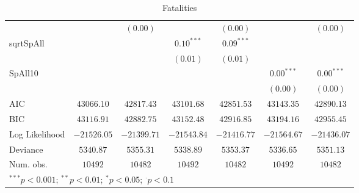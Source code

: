 \begin{sidewaystable}
\begin{center}
{\begin{tabular}{l c c c c c c}
                &               & $(0.00)$      &               & $(0.00)$      &               & $(0.00)$      \\
sqrtSpAll       &               &               & $0.10^{***}$  & $0.09^{***}$  &               &               \\
                &               &               & $(0.01)$      & $(0.01)$      &               &               \\
SpAll10         &               &               &               &               & $0.00^{***}$  & $0.00^{***}$  \\
                &               &               &               &               & $(0.00)$      & $(0.00)$      \\
\hline
AIC             & $43066.10$    & $42817.43$    & $43101.68$    & $42851.53$    & $43143.35$    & $42890.13$    \\
BIC             & $43116.91$    & $42882.75$    & $43152.48$    & $42916.85$    & $43194.16$    & $42955.45$    \\
Log Likelihood  & $-21526.05$   & $-21399.71$   & $-21543.84$   & $-21416.77$   & $-21564.67$   & $-21436.07$   \\
Deviance        & $5340.87$     & $5355.31$     & $5338.89$     & $5353.37$     & $5336.65$     & $5351.13$     \\
Num. obs.       & $10492$       & $10482$       & $10492$       & $10482$       & $10492$       & $10482$       \\
\hline
\multicolumn{7}{l}{\scriptsize{$^{***}p<0.001$; $^{**}p<0.01$; $^{*}p<0.05$; $^{\cdot}p<0.1$}}
\end{tabular}
}
\caption{Fatalities}
\label{deaths}
\end{center}
\end{sidewaystable}

